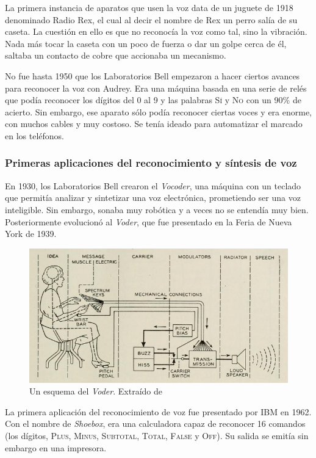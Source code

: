 La primera instancia de aparatos que usen la voz data de un juguete de 1918 denominado Radio Rex, el cual al decir el nombre de Rex un perro salía de su caseta. La cuestión en ello es que no reconocía la voz como tal, sino la vibración. Nada más tocar la caseta con un poco de fuerza o dar un golpe cerca de él, saltaba un contacto de cobre que accionaba un mecanismo.

No fue hasta 1950 que los Laboratorios Bell empezaron a hacer ciertos avances para reconocer la voz con Audrey. Era una máquina basada en una serie de relés que podía reconocer los dígitos del 0 al 9 y las palabras \textsc{Sí} y \textsc{No} con un 90\% de acierto. Sin embargo, ese aparato sólo podía reconocer ciertas voces y era enorme, con muchos cables y muy costoso. Se tenía ideado para automatizar el marcado en los teléfonos.

\subsubsection{Primeras aplicaciones del reconocimiento y síntesis de voz}
En 1930, los Laboratorios Bell crearon el \textit{Vocoder}, una máquina con un teclado que permitía analizar y sintetizar una voz electrónica, prometiendo ser una voz inteligible. Sin embargo, sonaba muy robótica y a veces no se entendía muy bien. Posteriormente evolucionó al \textit{Voder}, que fue presentado en la Feria de Nueva York de 1939.

\begin{figure}[H]
	\centering
	\includegraphics[width=\textwidth]{imagenes/Voder.png}
	\caption{Un esquema del \textit{Voder}. Extraído de \cite{voder}}
\end{figure}

La primera aplicación del reconocimiento de voz fue presentado por IBM en 1962. Con el nombre de \textit{Shoebox}, era una calculadora capaz de reconocer 16 comandos (los dígitos, \textsc{Plus}, \textsc{Minus}, \textsc{Subtotal}, \textsc{Total}, \textsc{False} y \textsc{Off}). Su salida se emitía sin embargo en una impresora.

